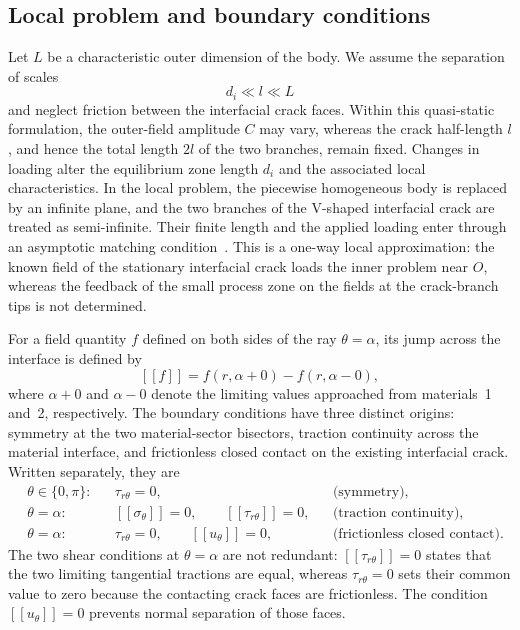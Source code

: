 \documentclass[pdflatex,onecolumn,sn-mathphys-ay]{sn-jnl}
\newcommand{\jump}[1]{\left[\!\left[#1\right]\!\right]}
\begin{document}
\subsection{Local problem and boundary conditions}
\label{subsec:boundary-conditions}

Let $L$ be a characteristic outer dimension of the body. We assume the
separation of scales
\begin{equation*}
  d_i\ll l\ll L
\end{equation*}
and neglect friction between the interfacial crack faces. Within this
quasi-static formulation, the outer-field amplitude $C$ may vary, whereas
the crack half-length $l$, and hence the total length $2l$ of the two
branches, remain fixed. Changes in loading alter the equilibrium zone length
$d_i$ and the associated local characteristics. In the local problem, the
piecewise homogeneous body is replaced by an infinite plane, and the two
branches of the V-shaped interfacial crack are treated as semi-infinite.
Their finite length and the applied loading enter through an asymptotic
matching condition~\citep{Nayfeh1973Perturbation}. This is a one-way local
approximation: the known field of the stationary interfacial crack loads the
inner problem near $O$, whereas the feedback of the small process zone on
the fields at the crack-branch tips is not determined.

For a field quantity $f$ defined on both sides of the ray
$\theta=\alpha$, its jump across the interface is defined by
\begin{equation*}
  \jump{f}
  =f(r,\alpha+0)-f(r,\alpha-0),
\end{equation*}
where $\alpha+0$ and $\alpha-0$ denote the limiting values approached
from materials~1 and~2, respectively. The boundary conditions have three distinct origins:
symmetry at the two material-sector bisectors, traction continuity across
the material interface, and frictionless closed contact on the existing
interfacial crack. Written separately, they are
\begin{equation}
\label{eq:interface-boundary-conditions}
\begin{aligned}
  &\theta\in\{0,\pi\}: &&
    \tau_{r\theta}=0,
    &&\text{(symmetry)},\\
  &\theta=\alpha: &&
    \jump{\sigma_\theta}=0,\qquad
    \jump{\tau_{r\theta}}=0,
    &&\text{(traction continuity)},\\
  &\theta=\alpha: &&
    \tau_{r\theta}=0,\qquad
    \jump{u_\theta}=0,
    &&\text{(frictionless closed contact)}.
\end{aligned}
\end{equation}
The two shear conditions at $\theta=\alpha$ are not redundant:
$\jump{\tau_{r\theta}}=0$ states that the two limiting tangential tractions
are equal, whereas $\tau_{r\theta}=0$ sets their common value to zero
because the contacting crack faces are frictionless. The condition
$\jump{u_\theta}=0$ prevents normal separation of those faces.
\end{document}
